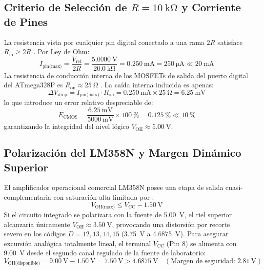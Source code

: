 \documentclass[11pt,letterpaper]{article}
\begin{document}
\subsection{Criterio de Selección de $R=\SI{10}{\kilo\ohm}$ y Corriente de Pines}
La resistencia vista por cualquier pin digital conectado a una rama $2R$ satisface $R_{\text{in}} \ge 2R$ \cite{franco2015}. Por Ley de Ohm:
\begin{equation}
I_{\text{pin(max)}} = \frac{V_{\text{ref}}}{2R} = \frac{\SI{5.0000}{\volt}}{\SI{20.0}{\kilo\ohm}} = \SI{0.250}{\milli\ampere} = \SI{250}{\micro\ampere} \ll \SI{20}{\milli\ampere}
\label{eq:corriente_pin}
\end{equation}
La resistencia de conducción interna de los MOSFETs de salida del puerto digital del ATmega328P es $R_{\text{on}} \approx \SI{25}{\ohm}$ \cite{sedra2020}. La caída interna inducida es apenas:
\begin{equation}
\Delta V_{\text{drop}} = I_{\text{pin(max)}} \cdot R_{\text{on}} = \SI{0.250}{\milli\ampere} \times \SI{25}{\ohm} = \SI{6.25}{\milli\volt}
\end{equation}
lo que introduce un error relativo despreciable de:
\begin{equation}
E_{\text{CMOS}} = \frac{\SI{6.25}{\milli\volt}}{\SI{5000}{\milli\volt}} \times \SI{100}{\percent} = \SI{0.125}{\percent} \ll \SI{10}{\percent}
\end{equation}
garantizando la integridad del nivel lógico $V_{\text{OH}} \approx \SI{5.00}{\volt}$.

\subsection{Polarización del LM358N y Margen Dinámico Superior}
El amplificador operacional comercial LM358N posee una etapa de salida cuasi-complementaria con saturación alta limitada por \cite{ti_lm358}:
\begin{equation}
V_{\text{OH(max)}} \le V_{\text{CC}} - \SI{1.50}{\volt}
\label{eq:voh_lm358}
\end{equation}
Si el circuito integrado se polarizara con la fuente de \SI{+5.00}{\volt}, el riel superior alcanzaría únicamente $V_{\text{OH}} \approx \SI{3.50}{\volt}$, provocando una distorsión por recorte severo en los códigos $D = 12, 13, 14, 15$ (\SI{3.75}{\volt} a \SI{4.6875}{\volt}). Para asegurar excursión analógica totalmente lineal, el terminal $V_{\text{CC}}$ (Pin 8) se alimenta con \SI{+9.00}{\volt} desde el segundo canal regulado de la fuente de laboratorio:
\begin{equation}
V_{\text{OH(disponible)}} = \SI{9.00}{\volt} - \SI{1.50}{\volt} = \SI{7.50}{\volt} > \SI{4.6875}{\volt} \quad (\text{Margen de seguridad: } \SI{+2.81}{\volt})
\end{equation}
\end{document}
